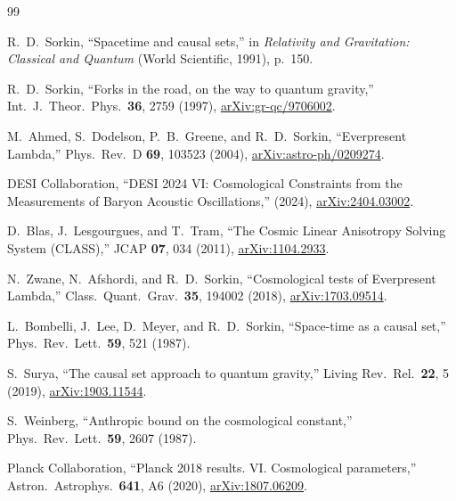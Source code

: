 \documentclass[aps,prd,twocolumn,superscriptaddress,nofootinbib]{revtex4-2}
\begin{document}
\begin{thebibliography}{99}

R.~D.~Sorkin,
``Spacetime and causal sets,''
in \emph{Relativity and Gravitation: Classical and Quantum} (World Scientific, 1991), p.~150.

R.~D.~Sorkin,
``Forks in the road, on the way to quantum gravity,''
Int.\ J.\ Theor.\ Phys.\ \textbf{36}, 2759 (1997),
\href{https://arxiv.org/abs/gr-qc/9706002}{arXiv:gr-qc/9706002}.

M.~Ahmed, S.~Dodelson, P.~B.~Greene, and R.~D.~Sorkin,
``Everpresent Lambda,''
Phys.\ Rev.\ D \textbf{69}, 103523 (2004),
\href{https://arxiv.org/abs/astro-ph/0209274}{arXiv:astro-ph/0209274}.

DESI Collaboration,
``DESI 2024 VI: Cosmological Constraints from the Measurements of Baryon Acoustic Oscillations,''
(2024),
\href{https://arxiv.org/abs/2404.03002}{arXiv:2404.03002}.

D.~Blas, J.~Lesgourgues, and T.~Tram,
``The Cosmic Linear Anisotropy Solving System (CLASS),''
JCAP \textbf{07}, 034 (2011),
\href{https://arxiv.org/abs/1104.2933}{arXiv:1104.2933}.

N.~Zwane, N.~Afshordi, and R.~D.~Sorkin,
``Cosmological tests of Everpresent Lambda,''
Class.\ Quant.\ Grav.\ \textbf{35}, 194002 (2018),
\href{https://arxiv.org/abs/1703.09514}{arXiv:1703.09514}.

L.~Bombelli, J.~Lee, D.~Meyer, and R.~D.~Sorkin,
``Space-time as a causal set,''
Phys.\ Rev.\ Lett.\ \textbf{59}, 521 (1987).

S.~Surya,
``The causal set approach to quantum gravity,''
Living Rev.\ Rel.\ \textbf{22}, 5 (2019),
\href{https://arxiv.org/abs/1903.11544}{arXiv:1903.11544}.

S.~Weinberg,
``Anthropic bound on the cosmological constant,''
Phys.\ Rev.\ Lett.\ \textbf{59}, 2607 (1987).

Planck Collaboration,
``Planck 2018 results. VI. Cosmological parameters,''
Astron.\ Astrophys.\ \textbf{641}, A6 (2020),
\href{https://arxiv.org/abs/1807.06209}{arXiv:1807.06209}.

\end{thebibliography}
\end{document}
